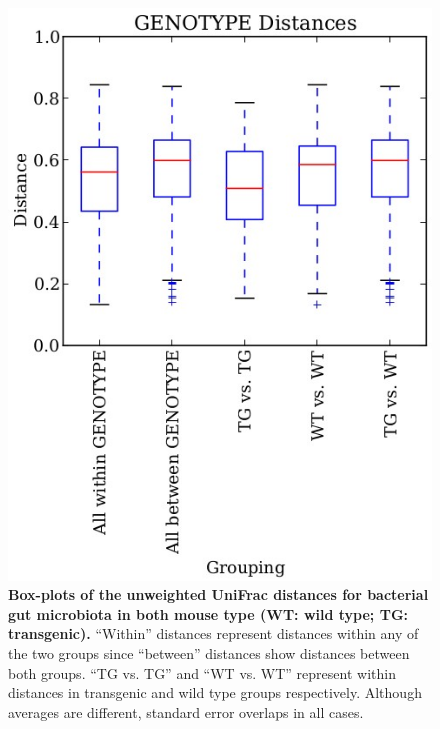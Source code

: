 \begin{figure}[htbp]
\includegraphics[width=0.75\columnwidth]{chapter_book_figures/Figure_12.jpg}
\caption[Box-plots of the unweighted UniFrac distances for bacterial gut microbiota in both mouse type (WT: wild type; TG: transgenic)]{\textbf{Box-plots of the unweighted UniFrac distances for bacterial gut microbiota in both mouse type (WT: wild type; TG: transgenic).}
“Within” distances represent distances within any of the two groups since “between” distances
show distances between both groups. “TG vs. TG” and “WT vs. WT” represent within distances in
transgenic and wild type groups respectively. Although averages are different, standard error overlaps
in all cases.}
\label{bfigure12}
\end{figure}

